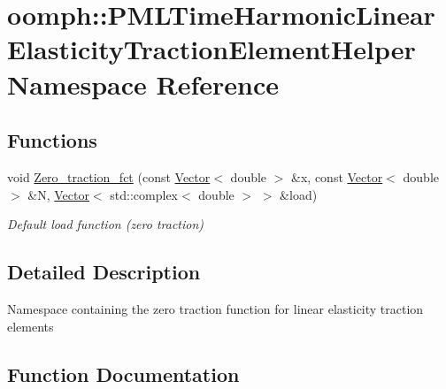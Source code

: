 \hypertarget{namespaceoomph_1_1PMLTimeHarmonicLinearElasticityTractionElementHelper}{}\section{oomph\+:\+:P\+M\+L\+Time\+Harmonic\+Linear\+Elasticity\+Traction\+Element\+Helper Namespace Reference}
\label{namespaceoomph_1_1PMLTimeHarmonicLinearElasticityTractionElementHelper}
\subsection*{Functions}
\begin{DoxyCompactItemize}
\item 
void \hyperlink{namespaceoomph_1_1PMLTimeHarmonicLinearElasticityTractionElementHelper_a504c052ae995d440c71bf5cc0a28a72a}{Zero\+\_\+traction\+\_\+fct} (const \hyperlink{classoomph_1_1Vector}{Vector}$<$ double $>$ \&x, const \hyperlink{classoomph_1_1Vector}{Vector}$<$ double $>$ \&N, \hyperlink{classoomph_1_1Vector}{Vector}$<$ std\+::complex$<$ double $>$ $>$ \&load)
\begin{DoxyCompactList}\small\item\em Default load function (zero traction) \end{DoxyCompactList}\end{DoxyCompactItemize}


\subsection{Detailed Description}
Namespace containing the zero traction function for linear elasticity traction elements 

\subsection{Function Documentation}
\mbox{\label{namespaceoomph_1_1PMLTimeHarmonicLinearElasticityTractionElementHelper_a504c052ae995d440c71bf5cc0a28a72a}} 
